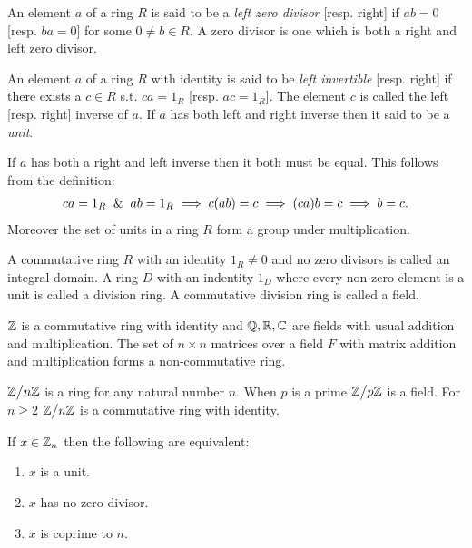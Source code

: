 \begin{definition}
  An element $a$ of a ring $R$ is said to be a \textit{left zero divisor} [resp. right] if $ab = 0$ [resp. $ba=0$] for some $0\neq b\in R$. A zero divisor is one which is both a right and left zero divisor.
\end{definition}
\begin{definition}
  An element $a$ of a ring $R$ with identity is said to be \textit{left invertible} [resp. right] if there exists a $c\in R$ s.t. $ca = 1_R$ [resp. $ac = 1_R$]. The element $c$ is called the left [resp. right] inverse of $a$. If $a$ has both left and right inverse then it said to be a \textit{unit}.
\end{definition}
\begin{remark}
  If $a$ has both a right and left inverse then it both must be equal. This follows from the definition:
  \begin{align*}
    ca = 1_R \And ab = 1_R \implies c(ab) = c \implies (ca)b = c \implies b=c.
  \end{align*}
  Moreover the set of units in a ring $R$ form a group under multiplication.
\end{remark}
\begin{definition}
  A commutative ring $R$ with an identity $1_R \neq 0$ and no zero divisors is called an integral domain. A ring $D$ with an indentity $1_D$ where every non-zero element is a unit is called a division ring. A commutative division ring is called a field.
\end{definition}
\begin{example}
  $\mathbb{Z}$ is a commutative ring with identity and $\mathbb{Q}, \mathbb{R}, \mathbb{C}$ are fields with usual addition and multiplication. The set of $n\times n$ matrices over a field $F$ with matrix addition and multiplication forms a non-commutative ring.
\end{example}
\begin{example}
  $\Z\bign/n\Z$ is a ring for any natural number $n$. When $p$ is a prime $\Z\bign/p\Z$ is a field. For $n\geq 2$ $\Z\bign/n\Z$ is a commutative ring with identity.
\end{example}
\begin{proposition}
  If $x\in \mathbb{Z}_n$ then the following are equivalent:
  \begin{enumerate}
    \item $x$ is a unit.
    \item $x$ has no zero divisor.
    \item $x$ is coprime to $n$.
  \end{enumerate}
\end{proposition}
